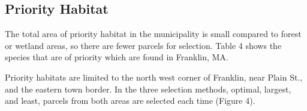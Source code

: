 \documentclass[12pt, stu, floatsintext,table]{apa7}
\begin{document}
\subsection{Priority Habitat} 
The total area of priority habitat in the municipality is small compared to forest or wetland areas, so there are fewer parcels for selection. Table 4 shows the species that are of priority which are found in Franklin, MA. 
\begin{table}[h]
\caption{Rare species found in Franklin, MA sorted by most recent observation (\href{https://www.mass.gov/info-details/rare-species-viewer}{Rare species viewer})}
\end{table}
Priority habitats are limited to the north west corner of Franklin, near Plain St., and the eastern town border. In the three selection methods, optimal, largest, and least, parcels from both areas are selected each time (Figure 4). 
\end{document}
